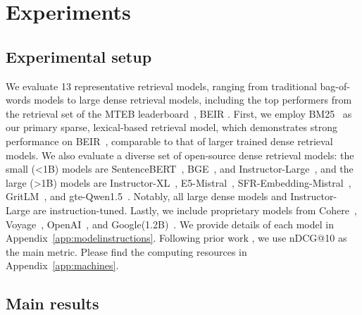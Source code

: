 
\section{Experiments}
\label{sec:experiments}

\subsection{Experimental setup}

We evaluate 13 representative retrieval models, ranging from traditional bag-of-words models to large dense retrieval models, including the top performers from the retrieval set of the MTEB leaderboard~\citep{muennighoff2022mteb}, BEIR \citep{thakur2021beir}. 
First, we employ BM25~\citep{robertson2009probabilistic} as our primary sparse, lexical-based retrieval model, which demonstrates strong performance on BEIR~\citep{thakur2021beir}, comparable to that of larger trained dense retrieval models. 
We also evaluate a diverse set of open-source dense retrieval models: the small (<1B) models are SentenceBERT~\citep[109M;][]{reimers2019sentence}, BGE~\citep[335M;][]{bge_embedding}, and Instructor-Large~\citep[335M][]{su2022one}, 
and the large (>1B) models are Instructor-XL~\citep[1.5B;][]{su2022one}, E5-Mistral~\citep[7.1B;][]{wang2023improving}, SFR-Embedding-Mistral~\citep[7.1B;][]{meng2024sfrembedding}, GritLM~\citep[7.1B;][]{muennighoff2024generative}, and gte-Qwen1.5~\citep[7.7B;][]{li2023towards}. 
Notably, all large dense models and Instructor-Large are instruction-tuned. 
Lastly, we include proprietary models from Cohere~\citep{cohereemb}, Voyage~\citep{voyageemb}, OpenAI~\citep{openaiemb}, and Google(1.2B)~\citep{lee2024gecko}. 
We provide details of each model in Appendix~\ref{app:modelinstructions}. Following prior work \citep{thakur2021beir,bajaj2018ms,voorhees2000building_trec}, we use nDCG@10 as the main metric. Please find the computing resources in Appendix~\ref{app:machines}. 


\subsection{Main results}

